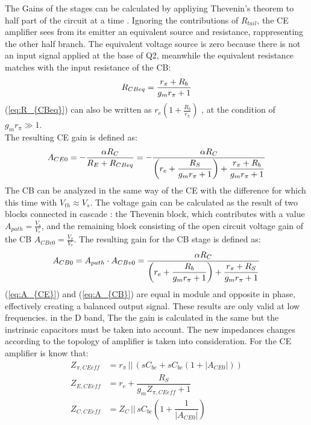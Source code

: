 \noindent
The Gains of the stages can be calculated by appliying Thevenin's theorem to half part of the circuit at a time \cite{Ultra Broadband Low-Power 70 GHz Active Balun in 130-nm SiGe BiCMOS} \cite{Microelectronic circuits}.
Ignoring the contributions of $R_{tail}$, the CE amplifier sees from its emitter an equivalent  source and resistance, rappresenting the other half branch. The equivalent voltage source is zero because there is not an input signal applied at the base of Q2, meanwhile the equivalent resistance matches with the input resistance of the CB:
\begin{equation}
    R_{CBeq}=\dfrac{r_{\pi}+R_b}{g_m r_{\pi}+1}
    \label{eq:R_{CBeq}}
\end{equation}
(\ref{eq:R_{CBeq}}) can also be written as $r_e\left( 1+\frac{R_b}{r_\pi}\right)$ \cite{Analysis and Design of Analog Integrated Circuits}, at the condition of $g_mr_{\pi}\gg1$.\\
The resulting CE gain is defined as:
\begin{equation}
    A_{CE0}=-\dfrac{\alpha R_C}{R_E+R_{CBeq}}=-\dfrac{\alpha R_C}{\left(r_e+\dfrac{R_S}{g_m r_{\pi}+1}\right)+\dfrac{r_{\pi}+R_b}{g_m r_{\pi}+1}}
    \label{eq:A_{CE}}
\end{equation}
\noindent
The CB can be analyzed in the same way of the CE with the difference for which this time with $V_{th}\approx V_s$. The voltage gain can be calculated as the result of two blocks connected in cascade \cite{Ultra Broadband Low-Power 70 GHz Active Balun in 130-nm SiGe BiCMOS}: the Thevenin block, which contributes with a value $A_{path}=\frac{V_s}{V_e}$, and the remaining block consisting of the open circuit voltage gain of the CB $A_{CBv0}=\frac{V_o}{V_e}$. 
The resulting gain for the CB stage is defined as:
\begin{equation}
    A_{CB0}=A_{path}\cdot A_{CBv0}= \dfrac{\alpha R_C}{\left(r_e+\dfrac{R_b}{g_m r_{\pi}+1}\right)+\dfrac{r_{\pi}+R_S}{g_m r_{\pi}+1}}
    \label{eq:A_{CB}}
\end{equation}
\noindent
(\ref{eq:A_{CE}}) and (\ref{eq:A_{CB}}) are equal in module and opposite in phase, effectively creating a balanced output signal. These results are only valid at low frequencies. in the D band, The the gain is calculated in the same but the instrinsic capacitors must be taken into account. The new impedances changes according to the topology of amplifier is taken into consideration. For the CE amplifier is know that:
\begin{align}
    Z_{\pi,CEeff}&= r_{\pi} \, || \, (sC_{be}+sC_{bc}(1+|A_{CE0}|))\\
    Z_{E,CEeff}  &= r_e+\dfrac{R_S}{g_m  Z_{\pi,CEeff}+1}\\
    Z_{C,CEeff}  &=Z_C \,|| \,sC_{bc}\left(1+\dfrac{1}{|A_{CE0}|}\right)
\end{align}

